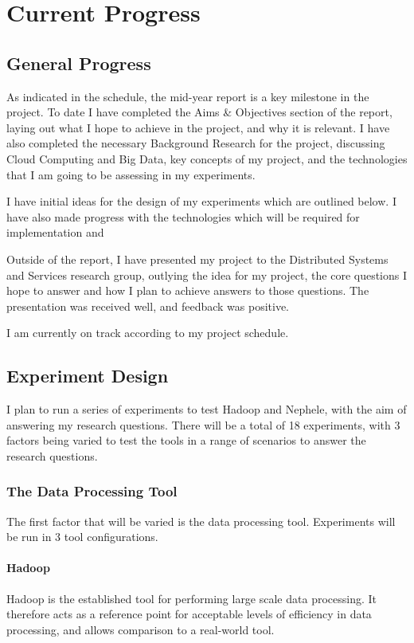 \chapter{Current Progress}

\section{General Progress}
As indicated in the schedule, the mid-year report is a key milestone in the project. To date I have completed the Aims \& Objectives section of the report, laying out what I hope to achieve in the project, and why it is relevant. I have also completed the necessary Background Research for the project, discussing Cloud Computing and Big Data, key concepts of my project, and the technologies that I am going to be assessing in my experiments. 

I have initial ideas for the design of my experiments which are outlined below. I have also made progress with the technologies which will be required for implementation and 

Outside of the report, I have presented my project to the Distributed Systems and Services research group, outlying the idea for my project, the core questions I hope to answer and how I plan to achieve answers to those questions. The presentation was received well, and feedback was positive.

I am currently on track according to my project schedule.

\section{Experiment Design}
I plan to run a series of experiments to test Hadoop and Nephele, with the aim of answering my research questions. There will be a total of 18 experiments, with 3 factors being varied to test the tools in a range of scenarios to answer the research questions.

\subsection{The Data Processing Tool}
The first factor that will be varied is the data processing tool. Experiments will be run in 3 tool configurations.

\subsubsection{Hadoop}
Hadoop is the established tool for performing large scale data processing. It therefore acts as a reference point for acceptable levels of efficiency in data processing, and allows comparison to a real-world tool. 

